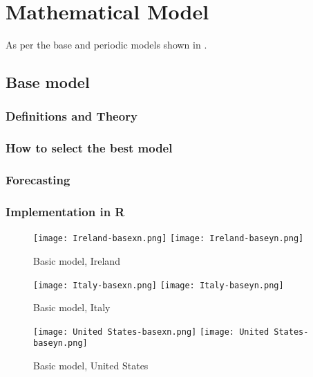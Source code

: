 \section{Mathematical Model}
\label{ch:mathmodel}

As per the base and periodic models shown in \cite{grigor20}.

\subsection{Base model}

\subsubsection{Definitions and Theory}

\subsubsection{How to select the best model}

\subsubsection{Forecasting}

\subsubsection{Implementation in R}

\begin{figure}[H]
  \texttt{[image: Ireland-basexn.png]} \label{fig:ireland-basexn}
\endminipage\hfill
{}
  \texttt{[image: Ireland-baseyn.png]} \label{fig:ireland-baseyn}
\endminipage
\caption{Basic model, Ireland}
\end{figure}

\begin{figure}[H]
  \texttt{[image: Italy-basexn.png]} \label{fig:italy-basexn}
\endminipage\hfill
{}
  \texttt{[image: Italy-baseyn.png]} \label{fig:italy-baseyn}
\endminipage
\caption{Basic model, Italy}
\end{figure}

\begin{figure}[H]
  \texttt{[image: United States-basexn.png]} \label{fig:usa-basexn}
\endminipage\hfill
{}
  \texttt{[image: United States-baseyn.png]} \label{fig:usa-baseyn}
\endminipage
\caption{Basic model, United States}
\end{figure}


